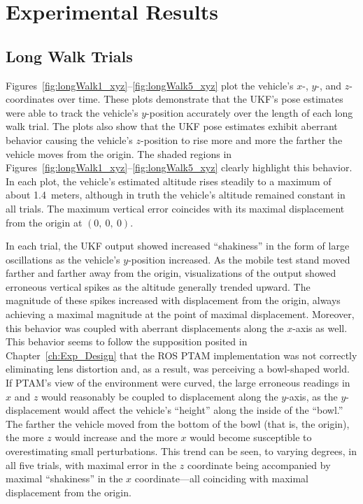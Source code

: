 \chapter{Experimental Results} \label{ch:Exp_Results}

\section{Long Walk Trials} \label{sec:long_walk}

Figures~\ref{fig:longWalk1_xyz}--\ref{fig:longWalk5_xyz} plot the vehicle's $x$-, $y$-, and $z$-coordinates over time. These plots demonstrate that the UKF's pose estimates were able to track the vehicle's $y$-position accurately over the length of each long walk trial. The plots also show that the UKF pose estimates exhibit aberrant behavior causing the vehicle's $z$-position to rise more and more the farther the vehicle moves from the origin. The shaded regions in Figures~\ref{fig:longWalk1_xyz}--\ref{fig:longWalk5_xyz} clearly highlight this behavior. In each plot, the vehicle's estimated altitude rises steadily to a maximum of about 1.4~meters, although in truth the vehicle's altitude remained constant in all trials. The maximum vertical error coincides with its maximal displacement from the origin at $\left( 0,\ 0,\ 0 \right)$.

In each trial, the UKF output showed increased ``shakiness'' in the form of large oscillations as the vehicle's $y$-position increased. As the mobile test stand moved farther and farther away from the origin, visualizations of the output showed erroneous vertical spikes as the altitude generally trended upward. The magnitude of these spikes increased with displacement from the origin, always achieving a maximal magnitude at the point of maximal displacement. Moreover, this behavior was coupled with aberrant displacements along the $x$-axis as well. This behavior seems to follow the supposition posited in Chapter~\ref{ch:Exp_Design} that the ROS PTAM implementation was not correctly eliminating lens distortion and, as a result, was perceiving a bowl-shaped world. If PTAM's view of the environment were curved, the large erroneous readings in $x$ and $z$ would reasonably be coupled to displacement along the $y$-axis, as the $y$-displacement would affect the vehicle's ``height'' along the inside of the ``bowl.'' The farther the vehicle moved from the bottom of the bowl (that is, the origin), the more $z$ would increase and the more $x$ would become susceptible to overestimating small perturbations. This trend can be seen, to varying degrees, in all five trials, with maximal error in the $z$ coordinate being accompanied by maximal ``shakiness'' in the $x$ coordinate---all coinciding with maximal displacement from the origin.

